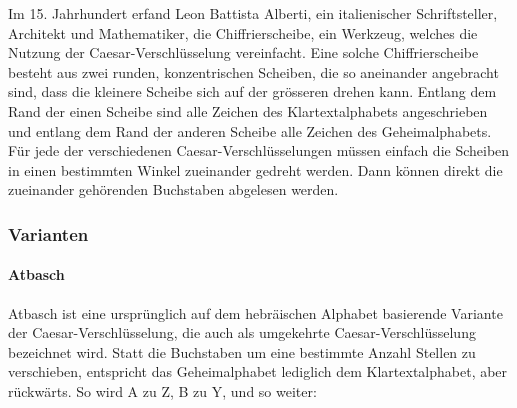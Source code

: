 Im 15. Jahrhundert erfand Leon Battista Alberti, ein italienischer Schriftsteller, Architekt und Mathematiker, die Chiffrierscheibe, ein Werkzeug, welches die Nutzung der Caesar-Verschlüsselung vereinfacht. Eine solche Chiffrierscheibe besteht aus zwei runden, konzentrischen Scheiben, die so aneinander angebracht sind, dass die kleinere Scheibe sich auf der grösseren drehen kann. Entlang dem Rand der einen Scheibe sind alle Zeichen des Klartextalphabets angeschrieben und entlang dem Rand der anderen Scheibe alle Zeichen des Geheimalphabets. Für jede der verschiedenen Caesar-Verschlüsselungen müssen einfach die Scheiben in einen bestimmten Winkel zueinander gedreht werden. Dann können direkt die zueinander gehörenden Buchstaben abgelesen werden.


\subsubsection{Varianten}
\label{sec:c-varianten}

\paragraph{Atbasch}
\label{sec:c-atbasch}
Atbasch ist eine ursprünglich auf dem hebräischen Alphabet basierende Variante der Caesar-Verschlüsselung, die auch als umgekehrte Caesar-Verschlüsselung bezeichnet wird. Statt die Buchstaben um eine bestimmte Anzahl Stellen zu verschieben, entspricht das Geheimalphabet lediglich dem Klartextalphabet, aber rückwärts. So wird A zu Z, B zu Y, und so weiter:


